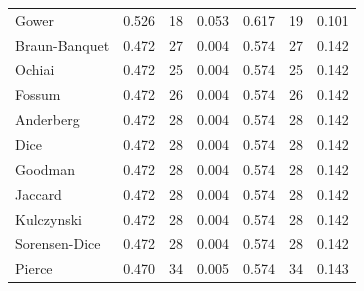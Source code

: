 \begin{table}[t]
{\begin{tabular}{lrrrrrr}
Gower & 0.526 & 18 & 0.053 & 0.617 & 19 & 0.101 \\
Braun-Banquet & 0.472 & 27 & 0.004 & 0.574 & 27 & 0.142 \\
Ochiai & 0.472 & 25 & 0.004 & 0.574 & 25 & 0.142 \\
Fossum & 0.472 & 26 & 0.004 & 0.574 & 26 & 0.142 \\
Anderberg & 0.472 & 28 & 0.004 & 0.574 & 28 & 0.142 \\
Dice & 0.472 & 28 & 0.004 & 0.574 & 28 & 0.142 \\
Goodman & 0.472 & 28 & 0.004 & 0.574 & 28 & 0.142 \\
Jaccard & 0.472 & 28 & 0.004 & 0.574 & 28 & 0.142 \\
Kulczynski & 0.472 & 28 & 0.004 & 0.574 & 28 & 0.142 \\
Sorensen-Dice & 0.472 & 28 & 0.004 & 0.574 & 28 & 0.142 \\
Pierce & 0.470 & 34 & 0.005 & 0.574 & 34 & 0.143 \\
\bottomrule
\end{tabular}
}
\end{table}
